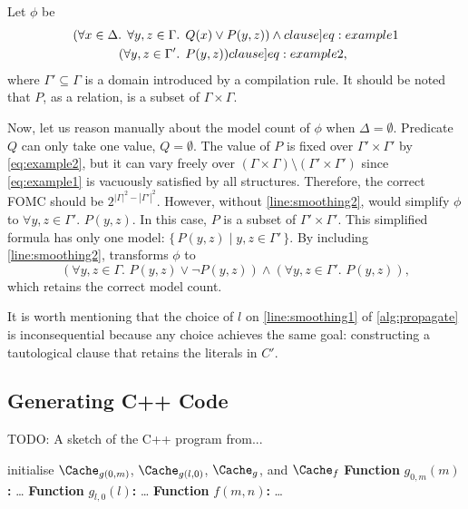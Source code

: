 \documentclass[a4paper,UKenglish,cleveref, autoref, thm-restate]{lipics-v2021}
\begin{document}
\begin{example}\label{example:basecasesmoothing}
  Let $\phi$ be
  \begin{align}
    (\forall x \in \Delta\text{. }\forall y, z \in \Gamma&\text{. }Q(x) \lor P(y, z))\land{}\label[clause]{eq:example1}\\
    (\forall y, z \in \Gamma'&\text{. }P(y, z))\label[clause]{eq:example2},
  \end{align}
  where $\Gamma' \subseteq \Gamma$ is a domain introduced by a compilation rule.
  It should be noted that $P$, as a relation, is a subset of
  $\Gamma \times \Gamma$.

  Now, let us reason manually about the model count of $\phi$ when
  $\Delta = \emptyset$. Predicate $Q$ can only take one value, $Q = \emptyset$.
  The value of $P$ is fixed over $\Gamma' \times \Gamma'$ by \cref{eq:example2},
  but it can vary freely over
  $(\Gamma \times \Gamma) \setminus (\Gamma' \times \Gamma')$ since
  \cref{eq:example1} is vacuously satisfied by all structures. Therefore, the
  correct FOMC should be $2^{|\Gamma|^2 - |\Gamma'|^2}$. However, without
  \autoref{line:smoothing2}, \Propagate would simplify $\phi$ to
  $\forall y, z \in \Gamma'\text{. }P(y, z)$. In this case, $P$ is a subset of
  $\Gamma' \times \Gamma'$. This simplified formula has only one model:
  $\{\, P(y, z) \mid y, z \in \Gamma' \,\}$. By including
  \autoref{line:smoothing2}, \Propagate transforms $\phi$ to
  \[
    (\forall y, z \in \Gamma\text{. }P(y, z) \lor \neg P(y, z)) \land (\forall y, z \in \Gamma'\text{. }P(y, z)),
  \]
  which retains the correct model count.
\end{example}

It is worth mentioning that the choice of $l$ on \autoref{line:smoothing1} of
\cref{alg:propagate} is inconsequential because any choice achieves the same
goal: constructing a tautological clause that retains the literals in $C'$.

\subsection{Generating C++ Code}\label{sec:cpp}

\begin{algorithm}[t]
  \caption{TODO: A sketch of the C++ program from...}
  initialise $\Cache_{g(0, m)}$, $\Cache_{g(l, 0)}$, $\Cache_{g}$, and $\Cache_{f}$\;
  \DontPrintSemicolon
  \textbf{Function} $g_{0,m}(m)$\textbf{:} \dots\;
  \textbf{Function} $g_{l,0}(l)$\textbf{:} \dots\;
  \PrintSemicolon
  \DontPrintSemicolon
  \textbf{Function} $f(m, n)$\textbf{:} \dots\;
  \PrintSemicolon
\end{algorithm}
\end{document}
